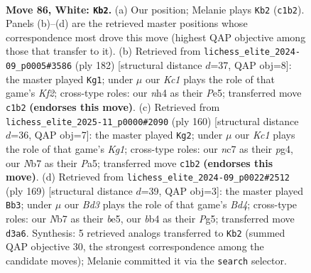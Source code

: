 \documentclass[11pt]{article}
\begin{document}
\clearpage

\begin{figure}[p]\centering
\begin{subfigure}{0.46\textwidth}\centering
\resizebox{\linewidth}{!}{%
\newchessgame
\chessboard[
  setfen={8/1Nn2k2/8/p7/Pb1pP2n/1P1B3p/4P3/2K5 w - - 38 86},
  showmover=false,
  pgfstyle=straightmove, color=movearrow, markmove={c1-b2}
]}
\caption{}
\end{subfigure}\hfill
\begin{subfigure}{0.46\textwidth}\centering
\resizebox{\linewidth}{!}{%
\newchessgame
\chessboard[
  setfen={8/5k2/p3p3/Pb2P1Bp/1P5P/8/5K2/8 w - - 64 92},
  showmover=false,
  pgfstyle=straightmove, color=movearrow, markmove={f2-g1}
]}
\caption{}
\end{subfigure}
\\[4pt]
\begin{subfigure}{0.46\textwidth}\centering
\resizebox{\linewidth}{!}{%
\newchessgame
\chessboard[
  setfen={8/8/8/P6p/3Bp1p1/3bP1P1/5P2/3k2K1 w - - 40 81},
  showmover=false,
  pgfstyle=straightmove, color=movearrow, markmove={g1-g2}
]}
\caption{}
\end{subfigure}\hfill
\begin{subfigure}{0.46\textwidth}\centering
\resizebox{\linewidth}{!}{%
\newchessgame
\chessboard[
  setfen={6k1/1p6/2p4p/2PbB1pP/1P4P1/4K3/8/8 b - - 2 85},
  showmover=false,
  pgfstyle=straightmove, color=movearrow, markmove={d5-b3}
]}
\caption{}
\end{subfigure}
\caption{\textbf{Move 86, White: \texttt{Kb2}.} (a) Our position; Melanie plays \texttt{Kb2} (\texttt{c1b2}). Panels (b)--(d) are the retrieved master positions whose correspondence most drove this move (highest QAP objective among those that transfer to it). (b) Retrieved from \texttt{lichess\_elite\_2024-09\_p0005\#3586} (ply 182) [structural distance $d$=37, QAP obj=8]: the master played \texttt{Kg1}; under $\mu$ our \emph{Kc1} plays the role of that game's \emph{Kf2}; cross-type roles: our \emph{n}h4 as their \emph{P}e5; transferred move \texttt{c1b2} \textbf{(endorses this move)}. (c) Retrieved from \texttt{lichess\_elite\_2025-11\_p0000\#2090} (ply 160) [structural distance $d$=36, QAP obj=7]: the master played \texttt{Kg2}; under $\mu$ our \emph{Kc1} plays the role of that game's \emph{Kg1}; cross-type roles: our \emph{n}c7 as their \emph{p}g4, our \emph{N}b7 as their \emph{P}a5; transferred move \texttt{c1b2} \textbf{(endorses this move)}. (d) Retrieved from \texttt{lichess\_elite\_2024-09\_p0022\#2512} (ply 169) [structural distance $d$=39, QAP obj=3]: the master played \texttt{Bb3}; under $\mu$ our \emph{Bd3} plays the role of that game's \emph{Bd4}; cross-type roles: our \emph{N}b7 as their \emph{b}e5, our \emph{b}b4 as their \emph{P}g5; transferred move \texttt{d3a6}. Synthesis: 5 retrieved analogs transferred to \texttt{Kb2} (summed QAP objective 30, the strongest correspondence among the candidate moves); Melanie committed it via the \texttt{search} selector.}
\label{fig:thought-m170}
\end{figure}
\end{document}
